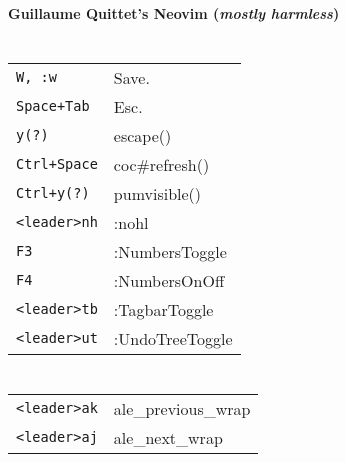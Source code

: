 




\raggedright
\footnotesize

\begin{center}
	\Huge{\textbf{Guillaume Quittet's Neovim (\textit{mostly harmless})}} \\
\end{center}
\vspace*{0.5cm}

\begin{multicols}{3}


	\setlength{\premulticols}{1pt}
	\setlength{\postmulticols}{1pt}
	\setlength{\multicolsep}{1pt}
	\setlength{\columnsep}{2pt}

	\section{}
	\begin{tabular}{@{}ll@{}}
		\verb!W, :w!      & Save.           \\
		\verb!Space+Tab!  & Esc.            \\
		\verb!y(?)!       & escape()        \\
		\verb!Ctrl+Space! & coc\#refresh()  \\
		\verb!Ctrl+y(?)!  & pumvisible()    \\
		\verb!<leader>nh! & :nohl           \\
		\verb!F3!         & :NumbersToggle  \\
		\verb!F4!         & :NumbersOnOff   \\
		\verb!<leader>tb! & :TagbarToggle   \\
		\verb!<leader>ut! & :UndoTreeToggle \\
	\end{tabular}

	\section{}
	\begin{tabular}{@{}ll@{}}
		\verb!<leader>ak! & ale\_previous\_wrap \\
		\verb!<leader>aj! & ale\_next\_wrap     \\
	\end{tabular}


\end{multicols}
